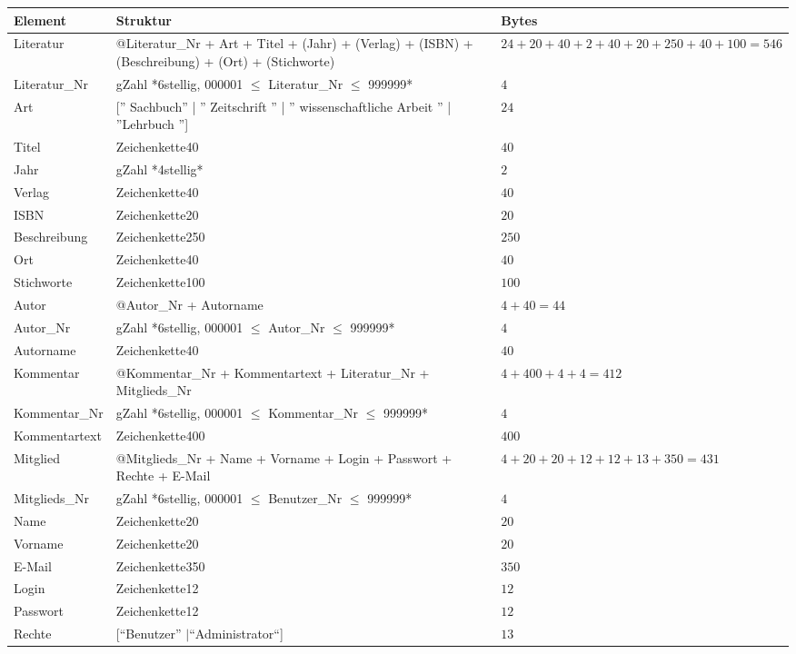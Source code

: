 \begin{longtable}{|l|p{6.0cm}|p{2cm}|}
\hline
Element & Struktur & Bytes\\
\hline\hline
\endhead

Literatur & @Literatur\_Nr + Art + Titel + (Jahr) + (Verlag) + (ISBN) + (Beschreibung) + (Ort) + (Stichworte) & $24 + 20 + 40 + 2 + 40 + 20 + 250 + 40 + 100 = 546$ \\
\hline
Literatur\_Nr & gZahl *6stellig, 000001 $\leq$ Literatur\_Nr $\leq$ 999999*  & $4$\\
\hline
Art & ['' Sachbuch'' | '' Zeitschrift '' | '' wissenschaftliche Arbeit '' | ''Lehrbuch ''] & $24$\\
\hline
Titel & Zeichenkette40 & $40$ \\
\hline
Jahr & gZahl *4stellig* & $2$\\
\hline
Verlag & Zeichenkette40 & $40$ \\
\hline
ISBN & Zeichenkette20 & $20$  \\
\hline
Beschreibung & Zeichenkette250 & $250$ \\
\hline
Ort & Zeichenkette40 & $40$ \\
\hline
Stichworte & Zeichenkette100 & $100$\\
\hline\hline

Autor & @Autor\_Nr + Autorname & $4 + 40 = 44  $\\
\hline
Autor\_Nr & gZahl *6stellig, 000001 $\leq$ Autor\_Nr $\leq$ 999999* & $4$ \\
\hline
Autorname & Zeichenkette40 & $40$\\
\hline\hline

Kommentar & @Kommentar\_Nr + Kommentartext + Literatur\_Nr + Mitglieds\_Nr & $4 + 400 + 4 + 4 = 412 $\\
\hline
Kommentar\_Nr & gZahl *6stellig, 000001 $\leq$ Kommentar\_Nr $\leq$ 999999* & $4$ \\
\hline
Kommentartext & Zeichenkette400 & $400$\\
\hline

Mitglied  & @Mitglieds\_Nr  + Name + Vorname + Login + Passwort + Rechte + E-Mail & $4 + 20 + 20  + 12 + 12 + 13 + 350 = 431 $\\
\hline
Mitglieds\_Nr & gZahl *6stellig, 000001 $\leq$ Benutzer\_Nr $\leq$ 999999* & $4$ \\ 
\hline
Name & Zeichenkette20 & $20$\\
\hline
Vorname & Zeichenkette20 & $20$ \\
\hline
E-Mail & Zeichenkette350 & $350$ \\
\hline
Login & Zeichenkette12 & $12$\\
\hline
Passwort & Zeichenkette12 & $12$\\
\hline
Rechte & [``Benutzer'' $\mid $``Administrator``] & $13$ \\
\hline\hline


\end{longtable}
